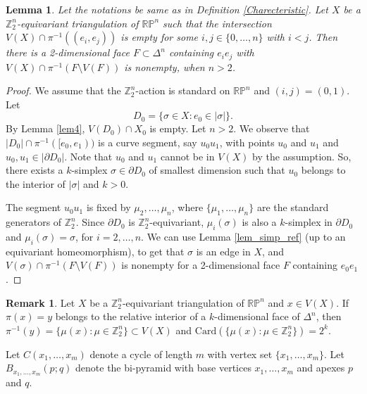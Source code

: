 \documentclass[11pt]{amsart}
\numberwithin{equation}{section}
\newtheorem{lemma}[theorem]{Lemma}
\theoremstyle{definition}
\newtheorem{remark}[theorem]{Remark}
\def \bb{\mathbb}
\def \ZZ{{\bb{Z}}}
\begin{document}
\begin{lemma}\label{lem5}
 Let the notations be same as in Definition \ref{Charecteristic}. Let $X$ be a $\ZZ_2^n$-equivariant triangulation of $\mathbb{RP}^n$ such that the intersection $V(X) \cap \pi^{-1}((e_i,e_j))$ is empty for some $i, j \in \{0, \ldots, n\}$ with $i < j$. Then there is a 2-dimensional face $F \subset \Delta^n$ containing $e_ie_j$ with $V(X) \cap \pi^{-1}(F\setminus V(F))$ is nonempty, when $n>2$.
\end{lemma}
\begin{proof}
We assume that the $\ZZ_2^n$-action  is standard on $\mathbb{RP}^n$ and $(i, j)= (0, 1)$. Let $$D_0 = \{\sigma \in X : e_0 \in |\sigma|\}.$$
By Lemma \ref{lem4}, $V(D_0) \cap X_0$ is empty. Let $n > 2$. 
We observe that $|D_0| \cap \pi^{-1}([e_0, e_1))$
is a curve segment, say $u_0u_1$, with points $u_0$ and $u_1$ and $u_0, u_1 \in |\partial{D_0}|$. Note that $u_0$ and $u_1$ cannot be in $V(X)$ by the assumption. So, there exists a $k$-simplex $\sigma \in \partial{D_0}$ of smallest dimension
such that $u_0 $ belongs to the interior of $ {|\sigma|}$ and $k > 0$.

The segment $u_0u_1$ is fixed by $\mu_2, \ldots, \mu_n$, where
$\{\mu_1, \ldots, \mu_n\}$ are the standard generators of $\ZZ_2^n$. Since $\partial{D_0}$ is $\ZZ_2^n$-equivariant, $\mu_i(\sigma)$ is also a $k$-simplex in $\partial{D_0}$ and $\mu_i(\sigma)=\sigma$, for $i=2, \ldots, n$. We can use Lemma \ref{lem_simp_ref} (up to an equivariant homeomorphism), to get that $\sigma$ is an edge in $X$, and $V(\sigma) \cap \pi^{-1}(F\setminus V(F))$ is nonempty for a 2-dimensional face $F$ containing $e_0e_1$. 

\end{proof}







\begin{remark}\label{remark}
 Let $X$ be a $\ZZ_2^n$-equivariant triangulation of $\mathbb{RP}^n$ and $x \in V(X)$. If $\pi(x)=y$ belongs to the relative interior of a $k$-dimensional face of $\Delta^n$,
then $\pi^{-1}(y) = \{\mu(x): \mu\in \ZZ_2^n\} \subset V(X)$ and $\mathrm{Card}(\{\mu(x): \mu\in \ZZ_2^n\}) = 2^k$. 
\end{remark}


Let $C(x_1,\dots,x_m)$ denote a cycle of length $m$ with vertex set $\{x_1,\dots,x_m\}$. 
Let $B_{x_1,\dots,x_m}(p;q)$ denote the bi-pyramid with base vertices $x_1,\dots,x_m$ and apexes $p$ and $q$.
\end{document}
